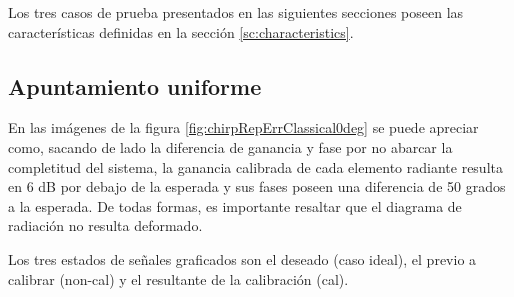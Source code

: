Los tres casos de prueba presentados en las siguientes secciones poseen las características definidas en la sección
\ref{sc:characteristics}.


\subsection{Apuntamiento uniforme}

En las imágenes de la figura \ref{fig:chirpRepErrClassical0deg} se puede apreciar como, sacando de lado la diferencia de 
ganancia y fase por no abarcar la completitud del sistema, la ganancia calibrada de cada elemento radiante resulta en 6 dB
por debajo de la esperada y sus fases poseen una diferencia de 50 grados a la esperada. De todas formas, es importante resaltar
que el diagrama de radiación no resulta deformado. 

Los tres estados de señales graficados son el deseado (caso ideal), el previo a calibrar (non-cal) y el resultante de la
calibración (cal).


